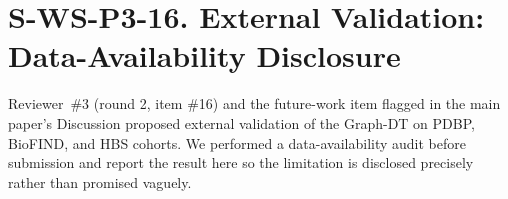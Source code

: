 \documentclass[11pt]{article}
\begin{document}

\section*{S-WS-P3-16. External Validation: Data-Availability Disclosure}

Reviewer~\#3 (round 2, item \#16) and the future-work item flagged in the main paper's Discussion proposed external validation of the Graph-DT on PDBP, BioFIND, and HBS cohorts. We performed a data-availability audit before submission and report the result here so the limitation is disclosed precisely rather than promised vaguely.
\end{document}
